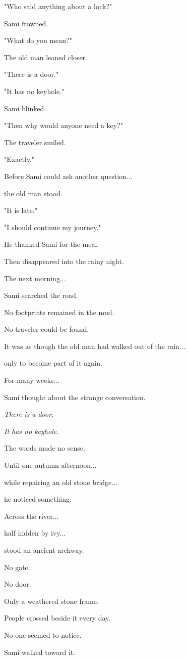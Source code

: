 \documentclass[12pt,openany]{book}
\begin{document}
"Who said anything about a lock?"

Sami frowned.

"What do you mean?"

The old man leaned closer.

"There is a door."

"It has no keyhole."

Sami blinked.

"Then why would anyone need a key?"

The traveler smiled.

"Exactly."

Before Sami could ask another question...

the old man stood.

"It is late."

"I should continue my journey."

He thanked Sami for the meal.

Then disappeared into the rainy night.

The next morning...

Sami searched the road.

No footprints remained in the mud.

No traveler could be found.

It was as though the old man had walked out of the rain...

only to become part of it again.

For many weeks...

Sami thought about the strange conversation.

\emph{There is a door.}

\emph{It has no keyhole.}

The words made no sense.

Until one autumn afternoon...

while repairing an old stone bridge...

he noticed something.

Across the river...

half hidden by ivy...

stood an ancient archway.

No gate.

No door.

Only a weathered stone frame.

People crossed beside it every day.

No one seemed to notice.

Sami walked toward it.
\end{document}
